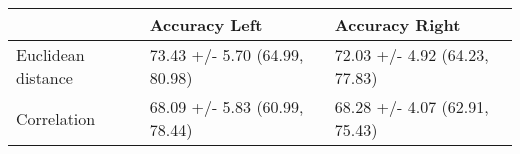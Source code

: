 \begin{tabular}{lll}
\toprule
{} &                  Accuracy Left &                 Accuracy Right \\
\midrule
Euclidean distance &  73.43 +/- 5.70 (64.99, 80.98) &  72.03 +/- 4.92 (64.23, 77.83) \\
Correlation        &  68.09 +/- 5.83 (60.99, 78.44) &  68.28 +/- 4.07 (62.91, 75.43) \\
\bottomrule
\end{tabular}
